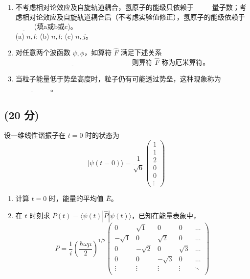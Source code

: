 \begin{enumerate}
    \item 不考虑相对论效应及自旋轨道耦合，氢原子的能级只依赖于 $\underline{\hspace{1cm}}$量子数；考虑相对论效应及自旋轨道耦合后（不考虑实验值修正），氢原子的能级依赖于 $\underline{\hspace{1cm}}$ (填a或b或c)。\\
   (a) $n, l$;  (b) $n, l$;  (c) $n, j$。
    \item 对任意两个波函数 $\psi, \phi$，如算符 $\hat{F}$ 满足下述关系 $\underline{\hspace{7cm}}$ 则算符 $\hat{F}$ 称为厄米算符。

    \item 当粒子能量低于势垒高度时，粒子仍有可能透过势垒，这种现象称为$\underline{\hspace{2cm}}$ 。
\end{enumerate}
\subsection{(20 分)}
设一维线性谐振子在 $t = 0$ 时的状态为
\[
|\psi(t=0)\rangle = \frac{1}{\sqrt{6}}
\begin{pmatrix}
1 \\
1 \\
2 \\
0 \\
0 \\
\vdots
\end{pmatrix}~
\]

\begin{enumerate}
    \item  计算 $t = 0$ 时，能量的平均值 $\overline E$。
    
    \item  在 $t$ 时刻求 $\overline P(t) = \langle \psi(t) | \hat{P} | \psi(t) \rangle$，已知在能量表象中，
    \[
    P = \frac{1}{i} \left(\frac{\hbar \omega \mu}{2}\right)^{1/2}
    \begin{pmatrix}
    0 & \sqrt{1} & 0 & 0 & \dots \\
    -\sqrt{1} & 0 & \sqrt{2} & 0 & \dots \\
    0 & -\sqrt{2} & 0 & \sqrt{3} & \dots \\
    0 & 0 & -\sqrt{3} & 0 & \dots \\
    \vdots & \vdots & \vdots & \vdots & \ddots \\
    \end{pmatrix}~
    \]
\end{enumerate}
